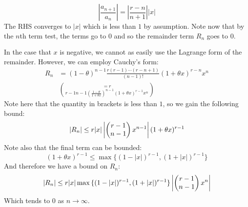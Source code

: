 \documentclass[../Main.tex]{subfiles}
\begin{document}
\begin{example}
\begin{equation*}
        \left|\frac{a_{n+1}}{a_n}\right| = \left|\frac{r-n}{n+1}\right||x|
    \end{equation*}
    The RHS converges to $|x|$ which is less than $1$ by assumption. Note now that by the $n$th term test, the terms go to $0$ and so the remainder term $R_n$ goes to $0$.\par
    In the case that $x$ is negative, we cannot as easily use the Lagrange form of the remainder. However, we can employ Cauchy's form:
    \begin{align*}
        R_n &= (1 - \theta)^{n-1} \frac{r(r-1)\cdots(r-n+1)}{(n-1)!} (1 + \theta x)^{r-n} x^n \\
        &= r \choose{r-1}{n-1} \left(\frac{1-\theta}{1+\theta x}\right)^{n-1} (1 + \theta x)^{r-1} x^n
    \end{align*}
    Note here that the quantity in brackets is less than $1$, so we gain the following bound:
    \begin{equation*}
        |R_n| \leq r|x| \left|\choose{r-1}{n-1}x^{n-1}\right|(1+\theta x)^{r-1}
    \end{equation*}
    Note also that the final term can be bounded:
    \begin{equation*}
        (1 + \theta x)^{r-1} \leq \max{\{(1 - |x|)^{r-1}, (1 + |x|)^{r-1}\}}
    \end{equation*}
    And therefore we have a bound on $R_n$:
    \begin{equation*}
        |R_n| \leq r|x|\max{\{(1 - |x|)^{r-1}, (1 + |x|)^{r-1}\}} \left|\choose{r-1}{n-1} x^n\right|
    \end{equation*}
    Which tends to $0$ as $n \to \infty$.
\end{example}
\end{document}
